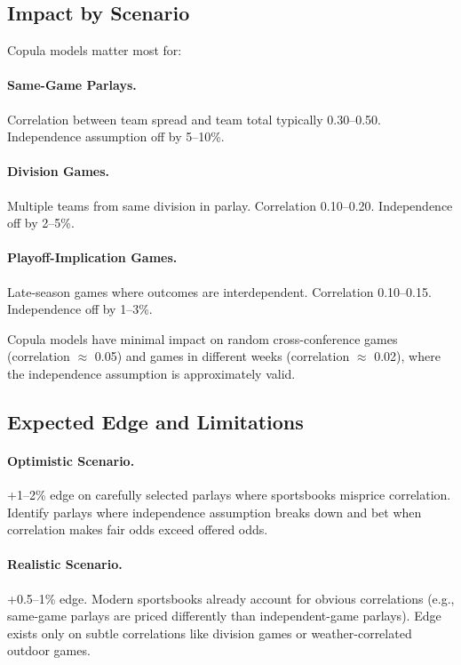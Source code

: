 \subsection{Impact by Scenario}
Copula models matter most for:

\paragraph{Same-Game Parlays.}
Correlation between team spread and team total typically 0.30--0.50. Independence assumption off by 5--10\%.

\paragraph{Division Games.}
Multiple teams from same division in parlay. Correlation 0.10--0.20. Independence off by 2--5\%.

\paragraph{Playoff-Implication Games.}
Late-season games where outcomes are interdependent. Correlation 0.10--0.15. Independence off by 1--3\%.

Copula models have minimal impact on random cross-conference games (correlation $\approx$ 0.05) and games in different weeks (correlation $\approx$ 0.02), where the independence assumption is approximately valid.

\subsection{Expected Edge and Limitations}

\paragraph{Optimistic Scenario.}
+1--2\% edge on carefully selected parlays where sportsbooks misprice correlation. Identify parlays where independence assumption breaks down and bet when correlation makes fair odds exceed offered odds.

\paragraph{Realistic Scenario.}
+0.5--1\% edge. Modern sportsbooks already account for obvious correlations (e.g., same-game parlays are priced differently than independent-game parlays). Edge exists only on subtle correlations like division games or weather-correlated outdoor games.

